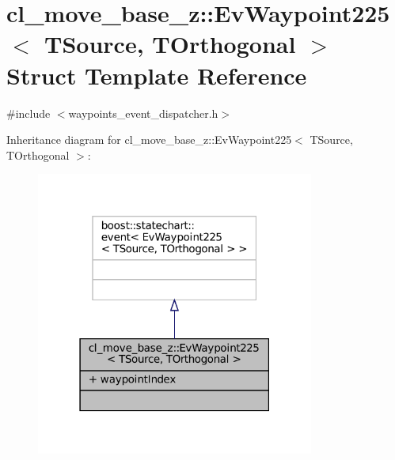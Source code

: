 \hypertarget{structcl__move__base__z_1_1EvWaypoint225}{}\section{cl\+\_\+move\+\_\+base\+\_\+z\+:\+:Ev\+Waypoint225$<$ T\+Source, T\+Orthogonal $>$ Struct Template Reference}
\label{structcl__move__base__z_1_1EvWaypoint225}


{\ttfamily \#include $<$waypoints\+\_\+event\+\_\+dispatcher.\+h$>$}



Inheritance diagram for cl\+\_\+move\+\_\+base\+\_\+z\+:\+:Ev\+Waypoint225$<$ T\+Source, T\+Orthogonal $>$\+:
\nopagebreak
\begin{figure}[H]
\begin{center}
\leavevmode
\includegraphics[width=259pt]{structcl__move__base__z_1_1EvWaypoint225__inherit__graph}
\end{center}
\end{figure}


